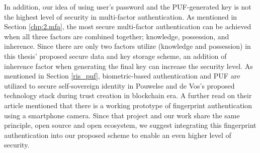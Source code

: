 In addition, our idea of using user's password and the PUF-generated key is not the highest level of security in multi-factor authentication. As mentioned in Section \ref{chp:2.mfa}, the most secure multi-factor authentication can be achieved when all three factors are combined together; knowledge, possession, and inherence. Since there are only two factors utilize (knowledge and possession) in this thesis' proposed secure data and key storage scheme, an addition of inherence factor when generating the final key can increase the security level. As mentioned in Section \ref{ris_puf}, biometric-based authentication and PUF are utilized to secure self-sovereign identity in Pouwelse and de Vos's proposed technology stack during trust creation in blockchain era. A further read on their article mentioned that there is a working prototype of fingerprint authentication using a smartphone camera. Since that project and our work share the same principle, open source and open ecosystem, we suggest integrating this fingerprint authentication into our proposed scheme to enable an even higher level of security.
